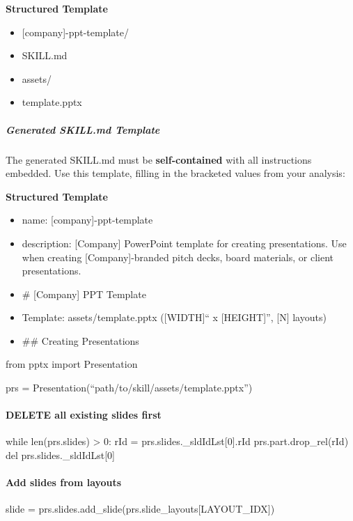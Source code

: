 \documentclass[11pt]{article}
\begin{document}
\textbf{Structured Template}
\begin{itemize}[leftmargin=*,itemsep=2pt,topsep=2pt]
\item {} [company]-ppt-template/
\item {} SKILL.md
\item {} assets/
\item {} template.pptx
\end{itemize}

\subparagraph{Generated SKILL.md Template}\mbox{}\par

The generated SKILL.md must be \textbf{self-contained} with all instructions embedded. Use this template, filling in the bracketed values from your analysis:


\textbf{Structured Template}
\begin{itemize}[leftmargin=*,itemsep=2pt,topsep=2pt]
\item {} name: [company]-ppt-template
\item {} description: [Company] PowerPoint template for creating presentations. Use when creating [Company]-branded pitch decks, board materials, or client presentations.
\item {} \# [Company] PPT Template
\item {} Template: assets/template.pptx ([WIDTH]`` x [HEIGHT]'', [N] layouts)
\item {} \#\# Creating Presentations
\end{itemize}
from pptx import Presentation


prs = Presentation(``path/to/skill/assets/template.pptx'')


\paragraph{DELETE all existing slides first}\mbox{}\par
while len(prs.slides) > 0: rId = prs.slides.\_\allowbreak{}sldIdLst[0].rId prs.part.drop\_\allowbreak{}rel(rId) del prs.slides.\_\allowbreak{}sldIdLst[0]


\paragraph{Add slides from layouts}\mbox{}\par
slide = prs.slides.add\_\allowbreak{}slide(prs.slide\_\allowbreak{}layouts[LAYOUT\_\allowbreak{}IDX])
\end{document}
